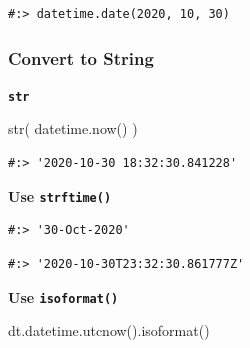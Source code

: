 \documentclass[
]{book}
\newenvironment{Shaded}{\begin{snugshade}}{\end{snugshade}}
\newcommand{\BuiltInTok}[1]{#1}
\newcommand{\CommentTok}[1]{\textcolor[rgb]{0.37,0.37,0.37}{\textit{#1}}}
\newcommand{\NormalTok}[1]{#1}
\newcommand{\SpecialCharTok}[1]{\textcolor[rgb]{0,0,0}{#1}}
\newcommand{\StringTok}[1]{\textcolor[rgb]{0.5,0.5,0.5}{#1}}
\begin{document}
\begin{verbatim}
#:> datetime.date(2020, 10, 30)
\end{verbatim}

\hypertarget{convert-to-string}{%
\subsubsection{Convert to String}\label{convert-to-string}}

\textbf{\texttt{str}}

\begin{Shaded}
\begin{Highlighting}[]
\BuiltInTok{str}\NormalTok{( datetime.now() )}
\end{Highlighting}
\end{Shaded}

\begin{verbatim}
#:> '2020-10-30 18:32:30.841228'
\end{verbatim}

\textbf{Use \texttt{strftime()}}

\begin{Shaded}
\end{Shaded}

\begin{verbatim}
#:> '30-Oct-2020'
\end{verbatim}

\begin{Shaded}
\end{Shaded}

\begin{verbatim}
#:> '2020-10-30T23:32:30.861777Z'
\end{verbatim}

\textbf{Use \texttt{isoformat()}}

\begin{Shaded}
\begin{Highlighting}[]
\NormalTok{dt.datetime.utcnow().isoformat()}
\end{Highlighting}
\end{Shaded}
\end{document}
